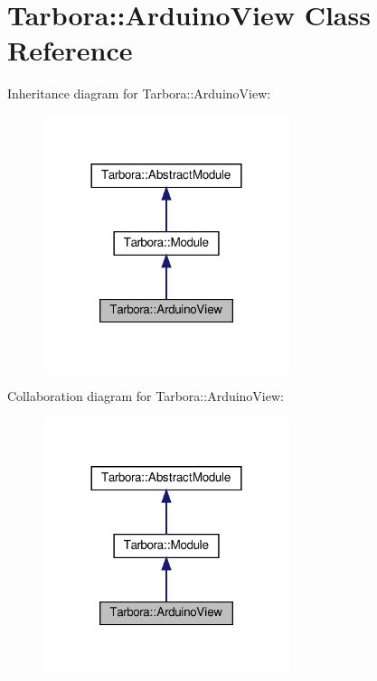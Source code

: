 \hypertarget{classTarbora_1_1ArduinoView}{}\section{Tarbora\+:\+:Arduino\+View Class Reference}
\label{classTarbora_1_1ArduinoView}


Inheritance diagram for Tarbora\+:\+:Arduino\+View\+:
\nopagebreak
\begin{figure}[H]
\begin{center}
\leavevmode
\includegraphics[width=204pt]{classTarbora_1_1ArduinoView__inherit__graph}
\end{center}
\end{figure}


Collaboration diagram for Tarbora\+:\+:Arduino\+View\+:
\nopagebreak
\begin{figure}[H]
\begin{center}
\leavevmode
\includegraphics[width=204pt]{classTarbora_1_1ArduinoView__coll__graph}
\end{center}
\end{figure}
